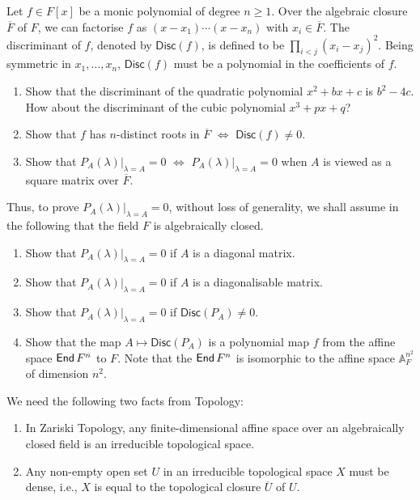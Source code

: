 \begin{problem}
Let $f \in F[x]$ be a monic polynomial of degree $n \geq 1$. Over the algebraic closure $\overline{F}$ of $F$, we can factorise $f$ as $(x - x_1) \cdots (x - x_n)$ with $x_i \in \overline{F}$. The discriminant of $f$, denoted by $\mathsf{Disc}(f)$, is defined to be $\prod_{i < j} {(x_i - x_j)}^2$. Being symmetric in $x_1, \ldots, x_n$, $\mathsf{Disc}(f)$ must be a polynomial in the coefficients of $f$.
\begin{enumerate}
  \item Show that the discriminant of the quadratic polynomial $x^2 + bx + c$ is $b^2 - 4c$. How about the discriminant of the cubic polynomial $x^3 + px + q$?
  \item Show that $f$ has $n$-distinct roots in $\overline{F}$ $\iff$ $\mathsf{Disc}(f) \neq 0$.
  \item Show that $P_A (\lambda)\big|_{\lambda = A} = 0$ $\iff$ $P_A(\lambda)\big|_{\lambda = A} = 0$ when $A$ is viewed as a square matrix over $\overline{F}$.
\end{enumerate}
Thus, to prove $P_A (\lambda) \big|_{\lambda = A} = 0$, without loss of generality, we shall assume in the following that the field $F$ is algebraically closed.
\begin{enumerate}\addtocounter{enumi}{3}
  \item Show that $P_A (\lambda) \big|_{\lambda = A} = 0$ if $A$ is a diagonal matrix.
  \item Show that $P_A (\lambda) \big|_{\lambda = A} = 0$ if $A$ is a diagonalisable matrix.
  \item Show that $P_A (\lambda) \big|_{\lambda = A} = 0$ if $\mathsf{Disc}(P_A) \neq 0$.
  \item Show that the map $A \mapsto \mathsf{Disc}(P_A)$ is a polynomial map $f$ from the affine space $\operatorname{\text{\normalfont\sffamily End}} F^n$ to $F$. Note that the $\operatorname{\text{\normalfont\sffamily End}} F^n$ is isomorphic to the affine space $\mathbb{A}^{n^2}_{F}$ of dimension $n^2$.
\end{enumerate}

We need the following two facts from Topology:
\begin{enumerate}[label=\arabic*.]
  \item In Zariski Topology, any finite-dimensional affine space over an algebraically closed field is an irreducible topological space.
  \item Any non-empty open set $U$ in an irreducible topological space $X$ must be dense, i.e., $X$ is equal to the topological closure $\overline{U}$ of $U$.
\end{enumerate}


\end{problem}
